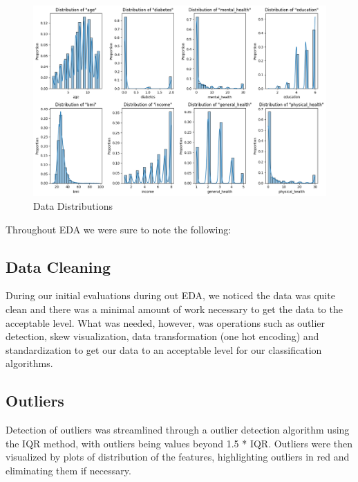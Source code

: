 \documentclass[conference]{IEEEtran}
\begin{document}
    \begin{figure}[h]
        \centering
        \includegraphics[scale=0.3]
        {dataplots.png}
        \caption{Data Distributions}

        \label{fig:bmi standardized}
    \end{figure}

    
Throughout EDA we were sure to note the following:

\subsection{Data Cleaning}
During our initial evaluations during out EDA, we noticed the data was quite clean and there was a minimal amount of work necessary to get the data to the acceptable level. What was needed, however, was operations such as outlier detection, skew visualization, data transformation (one hot encoding) and standardization to get our data to an acceptable level for our classification algorithms. 

\subsection{Outliers}
Detection of outliers was streamlined through a outlier detection algorithm using the IQR method, with outliers being values beyond 1.5 * IQR. Outliers were then visualized by plots of distribution of the features, highlighting outliers in red and eliminating them if necessary.
\end{document}
